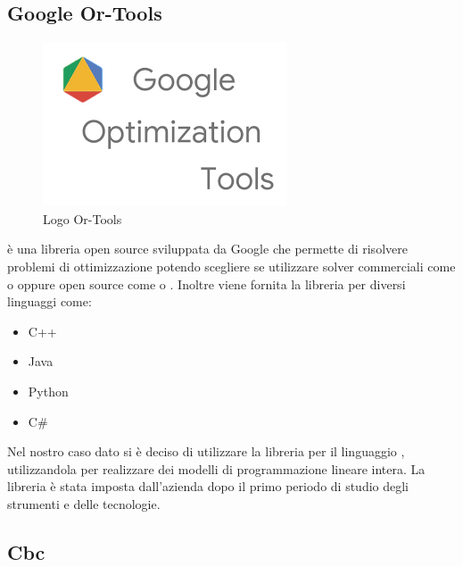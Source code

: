 \subsection{Google Or-Tools}
\begin{figure}[H]
	\begin{center} \includegraphics[scale=0.8]{figures/google_or_tools}
		\caption[Logo Or-Tools]{Logo Or-Tools}  
	\end{center}
\end{figure}
 è una libreria open source sviluppata da Google che permette di risolvere problemi di ottimizzazione potendo scegliere se utilizzare solver commerciali come  o  oppure open source come  o . Inoltre viene fornita la libreria per diversi linguaggi come:
\begin{itemize}
	\item C++
	\item Java
	\item Python
	\item C\#
\end{itemize}
Nel nostro caso dato si è deciso di utilizzare la libreria per il linguaggio , utilizzandola per realizzare dei modelli di programmazione lineare intera. La libreria è stata imposta dall'azienda dopo il primo periodo di studio degli strumenti e delle tecnologie.

\subsection{Cbc}

